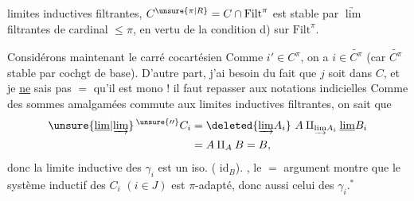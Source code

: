 limites inductives filtrantes, $C^{\unsure{\pi|R}}=C\cap\mathrm{Filt}^\pi$ est stable par $\underrightarrow{\lim}$ filtrantes de cardinal $\leq\pi$, en vertu de la condition d) sur $\mathrm{Filt}^\pi$.

Considérons maintenant le carré cocartésien
Comme $i'\in C^\pi$, on a $i\in\widetilde{C^\pi}$ (car $\widetilde{C^\pi}$ stable par cochgt de base). D'autre part, j'ai besoin du fait que $j$ soit dans $C$,  et je \uline{ne} sais pas $=$ qu'il est mono !  il faut repasser aux notations indicielles
Comme  des sommes amalgamées commute aux limites inductives filtrantes, on sait que
\[
 \begin{aligned}
 \unsure{\underline{\lim}|\underrightarrow{\lim}}\,^{\unsure{\prime\prime}} C_i
 &=\deleted{\underrightarrow{\lim}A_i}\ A\amalg_{\underrightarrow{\lim} A_i}\underline{\lim}B_i\\
 &=A\amalg_A B=B,
 \end{aligned}
\]
donc la limite inductive des $\gamma_i$ est un iso. ( $\mathrm{id}_B$). , le $=$ argument montre que le système inductif des $C_i$ $(i\in J)$  est  $\pi$-adapté, donc aussi celui des $\gamma_i$.$^{\ast}$

